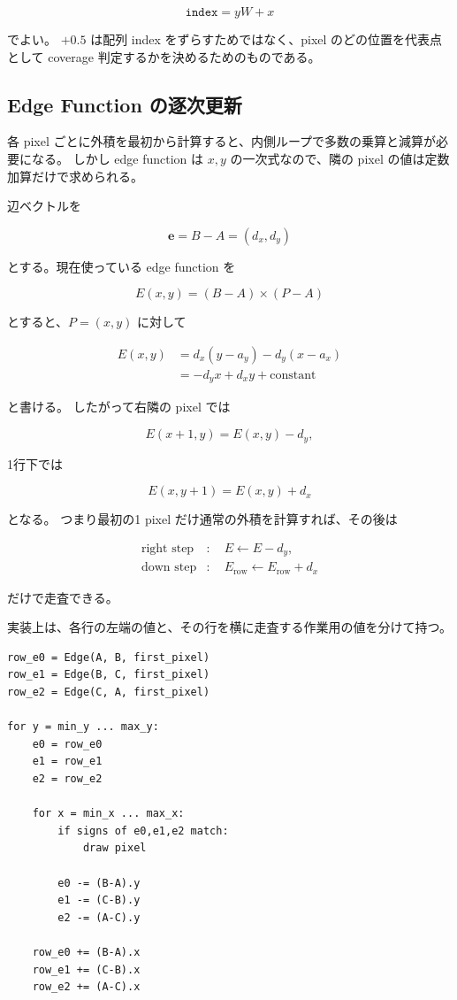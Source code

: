 \documentclass[a4paper,11pt]{ltjsarticle}
\begin{document}
\[
  \texttt{index}=yW+x
\]

でよい。
$+0.5$ は配列 index をずらすためではなく、pixel のどの位置を代表点として
coverage 判定するかを決めるためのものである。

\subsection{Edge Function の逐次更新}

各 pixel ごとに外積を最初から計算すると、内側ループで多数の乗算と減算が必要になる。
しかし edge function は $x,y$ の一次式なので、隣の pixel の値は定数加算だけで求められる。

辺ベクトルを

\[
  \bm{e}=B-A=(d_x,d_y)
\]

とする。現在使っている edge function を

\[
  E(x,y)
  =
  (B-A)\times(P-A)
\]

とすると、$P=(x,y)$ に対して

\begin{align*}
  E(x,y)
  &=d_x(y-a_y)-d_y(x-a_x)\\
  &=-d_yx+d_xy+\text{constant}
\end{align*}

と書ける。
したがって右隣の pixel では

\[
  E(x+1,y)=E(x,y)-d_y,
\]

1行下では

\[
  E(x,y+1)=E(x,y)+d_x
\]

となる。
つまり最初の1 pixel だけ通常の外積を計算すれば、その後は

\begin{align*}
  \text{right step} &: \quad E\leftarrow E-d_y,\\
  \text{down step}  &: \quad E_{\mathrm{row}}\leftarrow E_{\mathrm{row}}+d_x
\end{align*}

だけで走査できる。

実装上は、各行の左端の値と、その行を横に走査する作業用の値を分けて持つ。

\begin{verbatim}
row_e0 = Edge(A, B, first_pixel)
row_e1 = Edge(B, C, first_pixel)
row_e2 = Edge(C, A, first_pixel)

for y = min_y ... max_y:
    e0 = row_e0
    e1 = row_e1
    e2 = row_e2

    for x = min_x ... max_x:
        if signs of e0,e1,e2 match:
            draw pixel

        e0 -= (B-A).y
        e1 -= (C-B).y
        e2 -= (A-C).y

    row_e0 += (B-A).x
    row_e1 += (C-B).x
    row_e2 += (A-C).x
\end{verbatim}
\end{document}
